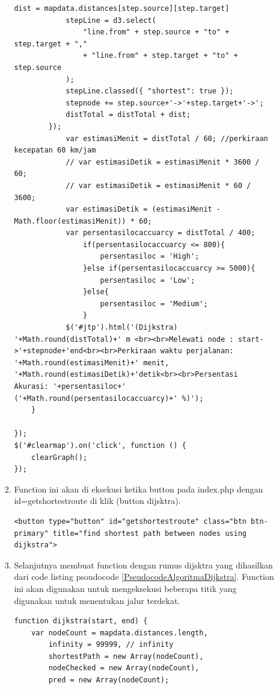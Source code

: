 \begin{enumerate}
\begin{enumerate}
\begin{enumerate}
\begin{lstlisting}[caption=Function OnClick Dijsktra]
            dist = mapdata.distances[step.source][step.target]
            stepLine = d3.select(
                "line.from" + step.source + "to" + step.target + ","
                + "line.from" + step.target + "to" + step.source
            );
            stepLine.classed({ "shortest": true });
            stepnode += step.source+'->'+step.target+'->';
            distTotal = distTotal + dist;
        });
            var estimasiMenit = distTotal / 60; //perkiraan kecepatan 60 km/jam
            // var estimasiDetik = estimasiMenit * 3600 / 60;
            // var estimasiDetik = estimasiMenit * 60 / 3600;
            var estimasiDetik = (estimasiMenit - Math.floor(estimasiMenit)) * 60;
            var persentasilocaccuarcy = distTotal / 400;
                if(persentasilocaccuarcy <= 800){
                    persentasiloc = 'High';
                }else if(persentasilocaccuarcy >= 5000){
                    persentasiloc = 'Low';
                }else{
                    persentasiloc = 'Medium';
                }
            $('#jtp').html('(Dijkstra) '+Math.round(distTotal)+' m <br><br>Melewati node : start->'+stepnode+'end<br><br>Perkiraan waktu perjalanan: '+Math.round(estimasiMenit)+' menit, '+Math.round(estimasiDetik)+'detik<br><br>Persentasi Akurasi: '+persentasiloc+' ('+Math.round(persentasilocaccuarcy)+' %)');
    }

});
$('#clearmap').on('click', function () {
    clearGraph();
});
\end{lstlisting}
\label{FunctionOnClickDijsktra}
    \item Function ini akan di eksekusi ketika button pada index.php dengan id=getshortestroute di klik (button dijsktra).
\begin{lstlisting}[caption=Button Dijsktra]
<button type="button" id="getshortestroute" class="btn btn-primary" title="find shortest path between nodes using dijkstra">
\end{lstlisting}
\label{ButtonDijsktra}

    \item Selanjutnya membuat function dengan rumus dijsktra yang dihasilkan dari code listing psoudocode \ref{PseudocodeAlgoritmaDijkstra}. Function ini akan digunakan untuk mengeksekusi beberapa titik yang digunakan untuk menentukan jalur terdekat.
\begin{lstlisting}[caption=Function Algoritma Dijsktra]
function dijkstra(start, end) {
    var nodeCount = mapdata.distances.length,
        infinity = 99999, // infinity
        shortestPath = new Array(nodeCount),
        nodeChecked = new Array(nodeCount),
        pred = new Array(nodeCount);


\end{lstlisting}
\end{enumerate}
\end{enumerate}
\end{enumerate}

